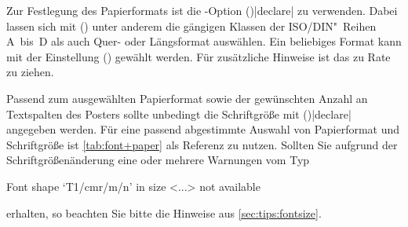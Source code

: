 \begin{Bundle*}[v2.05]{}
Zur Festlegung des Papierformats ist die \KOMAScript-Option 
()|declare| zu verwenden. Dabei lassen 
sich mit () unter anderem 
die gängigen Klassen der ISO/DIN"~Reihen A~bis~D als auch Quer- oder 
Längsformat auswählen. Ein beliebiges Format kann mit der Einstellung
() gewählt werden. 
Für zusätzliche Hinweise ist das \scrguide zu Rate zu ziehen.

Passend zum ausgewählten Papierformat sowie der gewünschten Anzahl an 
Textspalten des Posters sollte unbedingt die Schriftgröße mit 
()|declare| 
angegeben werden. Für eine passend abgestimmte Auswahl von Papierformat und 
Schriftgröße ist \autoref{tab:font+paper} als Referenz zu nutzen. Sollten Sie 
aufgrund der Schriftgrößenänderung eine oder mehrere Warnungen vom Typ
%
\begin{quoting}
\begin{Code}
Font shape `T1/cmr/m/n' in size <...> not available
\end{Code}
\end{quoting}
%
erhalten, so beachten Sie bitte die Hinweise aus \autoref{sec:tips:fontsize}.



\end{Bundle*}
